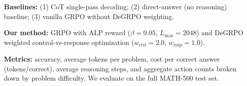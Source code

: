 \documentclass{article}
\begin{document}
\textbf{Baselines:} (1) CoT single-pass decoding; (2) direct-answer (no reasoning) baseline; (3) vanilla GRPO without DeGRPO weighting.

\textbf{Our method:} GRPO with ALP reward ($\beta{=}0.05$, $L_{\max}{=}2048$) and DeGRPO weighted control-vs-response optimization ($w_{\text{ctrl}}{=}2.0$, $w_{\text{resp}}{=}1.0$).

\textbf{Metrics:} accuracy, average tokens per problem, cost per correct answer (tokens/correct), average reasoning steps, and aggregate action counts broken down by problem difficulty. We evaluate on the full MATH-500 test set.



\end{document}
